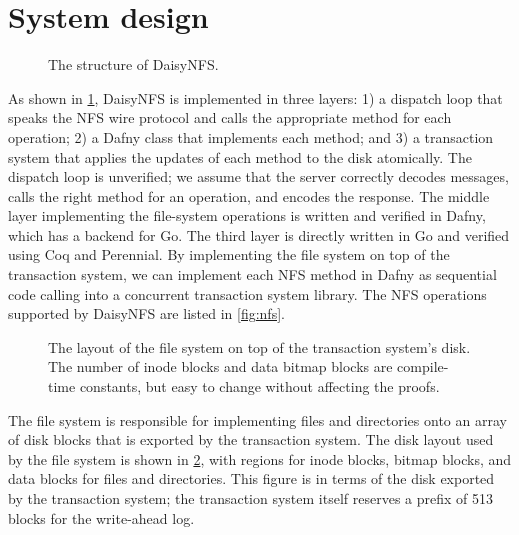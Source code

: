 \section{System design}%
\label{sec:daisy:system}

\begin{figure}
  \center
  
  \caption{The structure of DaisyNFS.}
  \label{fig:system}
\end{figure}

As shown in \cref{fig:system}, DaisyNFS is implemented in three layers:
1) a dispatch loop that speaks the NFS wire protocol and calls the
appropriate method for each operation; 2) a Dafny class that
implements each method; and 3) a transaction system that applies the
updates of each method to the disk atomically.  The dispatch loop is
unverified; we assume that the server correctly decodes messages,
calls the right method for an operation, and encodes the response. The
middle layer implementing the file-system operations is written
and verified in Dafny, which has a backend for Go.  The
third layer is directly written in Go and verified using Coq and
Perennial.  By implementing the file system on top of the transaction
system, we can implement each NFS method in Dafny as sequential code
calling into a concurrent transaction system library. The NFS
operations supported by DaisyNFS are listed in \cref{fig:nfs}.


\begin{figure}
  \centering
  
  \caption{The layout of the file system on top of the transaction system's
    disk. The number of inode blocks and data bitmap blocks are compile-time
    constants, but easy to change without affecting the proofs.}
  \label{fig:layout}
\end{figure}

The file system is responsible for implementing files and directories
onto an array of disk blocks that is exported by the transaction
system.  The disk layout used by the file system is shown in
\cref{fig:layout}, with regions for inode blocks, bitmap blocks,
and data blocks for files and directories. This figure is in terms of
the disk exported by the transaction system; the transaction system
itself reserves a prefix of 513 blocks for the write-ahead log.

